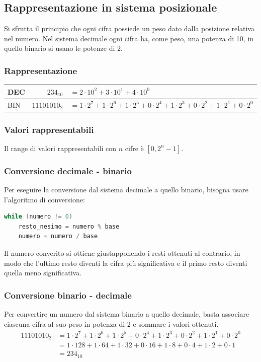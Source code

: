 \documentclass{article}
\begin{document}
\newpage


\subsection{Rappresentazione in sistema posizionale}
Si sfrutta il principio che ogni cifra possiede un peso dato dalla posizione relativa nel numero. Nel sistema decimale ogni
cifra ha, come peso, una potenza di 10, in quello binario si usano le potenze di 2.

\subsubsection*{Rappresentazione}
\begin{center}
	\begin{tabularx}{\textwidth}{l r X}
		DEC & \(234_{10}\) & \(= 2 \cdot 10 ^ 2 + 3 \cdot 10 ^ 1 + 4 \cdot 10 ^ 0 \) \\
		\midrule
		BIN & \(11101010_2\) & \(= 1 \cdot 2 ^ 7 + 1 \cdot 2 ^ 6 + 1 \cdot 2 ^ 5 + 0 \cdot 2 ^ 4 + 1 \cdot 2 ^ 3 + 0 \cdot 2 ^ 2 + 1 \cdot 2 ^ 1 + 0 \cdot 2 ^ 0\)
	\end{tabularx}
\end{center}

\subsubsection*{Valori rappresentabili}
Il range di valori rappresentabili con \(n\) cifre è \(\left[ 0, 2^n - 1 \right]\).

\subsubsection*{Conversione decimale - binario}
Per eseguire la conversione dal sistema decimale a quello binario, bisogna usare l'algoritmo di conversione:
\begin{lstlisting}[language=Java]
while (numero != 0)
	resto_nesimo = numero % base
	numero = numero / base
\end{lstlisting}

Il numero converito si ottiene giustapponendo i resti ottenuti al contrario, in modo che l'ultimo resto diventi la cifra più
significativa e il primo resto diventi quella meno significativa.

\subsubsection*{Conversione binario - decimale}
Per convertire un numero dal sistema binario a quello decimale, basta associare ciascuna cifra al suo peso in potenza
di 2 e sommare i valori ottenuti.
\begin{align*}
	11101010_2 &=  1 \cdot 2 ^ 7 + 1 \cdot 2 ^ 6 + 1 \cdot 2 ^ 5 + 0 \cdot 2 ^ 4 + 1 \cdot 2 ^ 3 + 0 \cdot 2 ^ 2 + 1 \cdot 2 ^ 1 + 0 \cdot 2 ^ 0 \\
	&=  1 \cdot 128 + 1 \cdot 64 + 1 \cdot 32 + 0 \cdot 16 + 1 \cdot 8 + 0 \cdot 4 + 1 \cdot 2 + 0 \cdot 1 \\
	&= 234_{10}
\end{align*}
\end{document}
